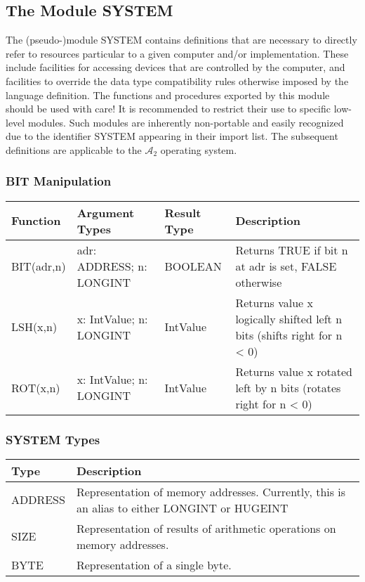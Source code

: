 \documentclass[a4paper,11pt]{article}
\newcommand{\AZ}{\ensuremath{\mathcal{A}_{2}}\xspace}
\begin{document}
\subsection{The Module SYSTEM}
The (pseudo-)module SYSTEM contains definitions that are necessary to directly refer to resources particular to a given computer and/or implementation. These include facilities for accessing devices that are controlled by the computer, and facilities to override the data type compatibility rules otherwise imposed by the language definition. The functions and procedures exported by this module should be used with care! It is recommended to restrict their use to specific low-level modules. Such modules are inherently non-portable and easily recognized due to the identifier SYSTEM appearing in their import list.
The subsequent definitions are applicable to the \AZ operating system.

\subsubsection{BIT Manipulation}
\begin{longtable}{|p{3cm}|p{3cm}|p{2cm}|p{6cm}|}
\hline
Function & Argument Types & Result Type & Description \\
\hline\hline
\endhead
BIT(adr,n) & adr: ADDRESS; n: LONGINT & BOOLEAN & Returns TRUE if bit n at adr is set, FALSE otherwise \\
LSH(x,n) & x: IntValue; n: LONGINT & IntValue & Returns value x logically shifted left n bits (shifts right for n < 0) \\
ROT(x,n) & x: IntValue; n: LONGINT &  IntValue & Returns value x rotated left by  n bits (rotates right for n < 0) \\
\hline
\end{longtable}

\subsubsection{SYSTEM Types}
\begin{longtable}{|p{3cm}|p{12cm}|}
\hline
Type & Description \\
\hline\hline
\endhead
ADDRESS & Representation of memory addresses. Currently, this is an alias to either LONGINT or HUGEINT \\
SIZE & Representation of results of arithmetic operations on memory addresses.\\
\hline
BYTE & Representation of a single byte.\\
\hline
\end{longtable}
\end{document}
